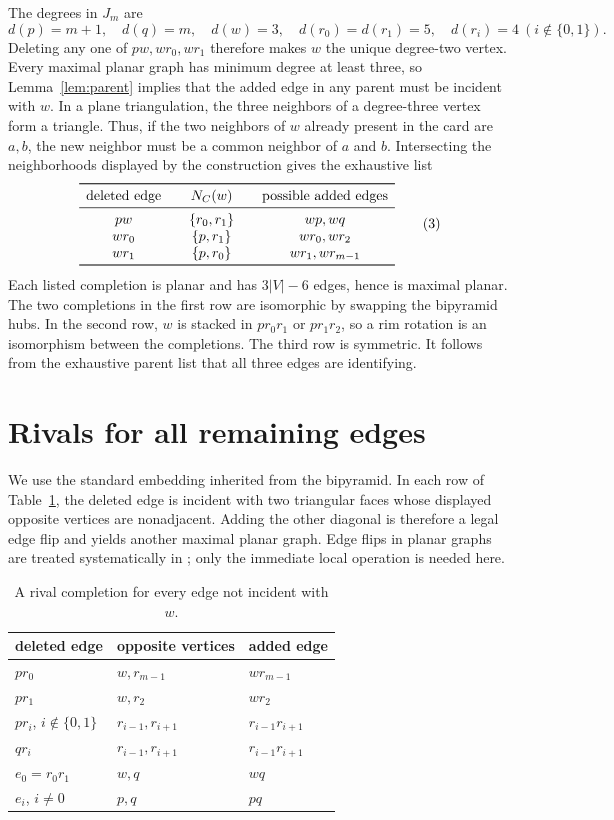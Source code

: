 \documentclass[11pt]{article}
\begin{document}
The degrees in $J_m$ are
\[
 d(p)=m+1,\quad d(q)=m,\quad d(w)=3,\quad
 d(r_0)=d(r_1)=5,
 \quad d(r_i)=4\ (i\notin\{0,1\}).                    \tag{2}
\]
Deleting any one of $pw,wr_0,wr_1$ therefore makes $w$ the unique
degree-two vertex.  Every maximal planar graph has minimum degree at least
three, so Lemma~\ref{lem:parent} implies that the added edge in any parent
must be incident with $w$.  In a plane triangulation, the three neighbors
of a degree-three vertex form a triangle.  Thus, if the two neighbors of
$w$ already present in the card are $a,b$, the new neighbor must be a
common neighbor of $a$ and $b$.  Intersecting the neighborhoods displayed
by the construction gives the exhaustive list
\[
\begin{array}{c@{\qquad}c@{\qquad}c}
\toprule
\text{deleted edge}&N_C(w)&\text{possible added edges}\\
\midrule
pw    &\{r_0,r_1\}&wp,wq\\
wr_0  &\{p,r_1\}&wr_0,wr_2\\
wr_1  &\{p,r_0\}&wr_1,wr_{m-1}\\
\bottomrule
\end{array}                                                   \tag{3}
\]
Each listed completion is planar and has $3|V|-6$ edges, hence is maximal
planar.  The two completions in the first row are isomorphic by swapping
the bipyramid hubs.  In the second row, $w$ is stacked in
$pr_0r_1$ or $pr_1r_2$, so a rim rotation is an isomorphism between the
completions.  The third row is symmetric.  It follows from the exhaustive
parent list that all three edges are identifying.

\section{Rivals for all remaining edges}

We use the standard embedding inherited from the bipyramid.  In each row
of Table~\ref{tab:flips}, the deleted edge is incident with two triangular
faces whose displayed opposite vertices are nonadjacent.  Adding the other
diagonal is therefore a legal edge flip and yields another maximal planar
graph.  Edge flips in planar graphs are treated systematically in
\cite{BoseHurtado2009}; only the immediate local operation is needed here.

\begin{table}[ht]
\centering
\caption{A rival completion for every edge not incident with $w$.}
\label{tab:flips}
\begin{tabular}{lll}
\toprule
deleted edge&opposite vertices&added edge\\
\midrule
$pr_0$&$w,r_{m-1}$&$wr_{m-1}$\\
$pr_1$&$w,r_2$&$wr_2$\\
$pr_i$, $i\notin\{0,1\}$&$r_{i-1},r_{i+1}$&$r_{i-1}r_{i+1}$\\
$qr_i$&$r_{i-1},r_{i+1}$&$r_{i-1}r_{i+1}$\\
$e_0=r_0r_1$&$w,q$&$wq$\\
$e_i$, $i\ne0$&$p,q$&$pq$\\
\bottomrule
\end{tabular}
\end{table}
\end{document}
